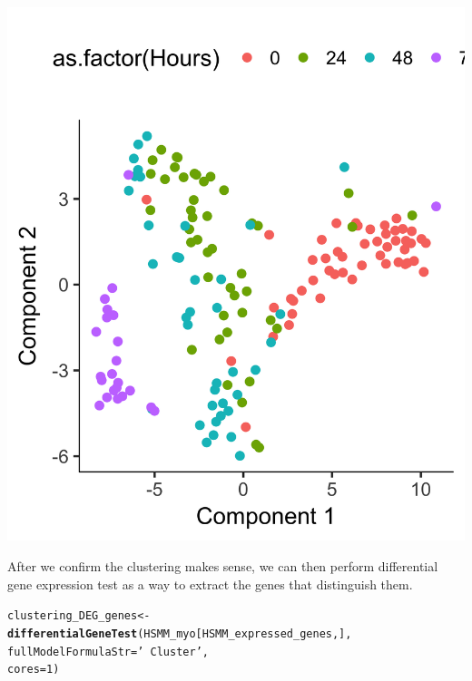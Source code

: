 \documentclass[10pt,oneside]{article}\usepackage[]{graphicx}\usepackage[]{color}
\makeatletter
\def\maxwidth{ %
  \ifdim\Gin@nat@width>\linewidth
    \linewidth
  \else
    \Gin@nat@width
  \fi
}
\newcommand{\hlnum}[1]{\textcolor[rgb]{0.686,0.059,0.569}{#1}}%
\newcommand{\hlstr}[1]{\textcolor[rgb]{0.192,0.494,0.8}{#1}}%
\newcommand{\hlstd}[1]{\textcolor[rgb]{0.345,0.345,0.345}{#1}}%
\newcommand{\hlkwb}[1]{\textcolor[rgb]{0.69,0.353,0.396}{#1}}%
\newcommand{\hlkwc}[1]{\textcolor[rgb]{0.333,0.667,0.333}{#1}}%
\newcommand{\hlkwd}[1]{\textcolor[rgb]{0.737,0.353,0.396}{\textbf{#1}}}%
\newenvironment{kframe}{%
 \def\at@end@of@kframe{}%
 \ifinner\ifhmode%
  \def\at@end@of@kframe{\end{minipage}}%
  \begin{minipage}{\columnwidth}%
 \fi\fi%
 \def\FrameCommand##1{\hskip\@totalleftmargin \hskip-\fboxsep
 \colorbox{shadecolor}{##1}\hskip-\fboxsep
     \hskip-\linewidth \hskip-\@totalleftmargin \hskip\columnwidth}%
 \MakeFramed {\advance\hsize-\width
   \@totalleftmargin\z@ \linewidth\hsize
   \@setminipage}}%
 {\par\unskip\endMakeFramed%
 \at@end@of@kframe}
\newenvironment{knitrout}{}{} %
\makeatother
\begin{document}
\begin{knitrout}
\includegraphics[width=\maxwidth]{figure/check_clustering_again-2} 

\end{knitrout}

After we confirm the clustering makes sense, we can then perform differential 
gene expression test as a way to extract the genes that distinguish them. 
\begin{knitrout}
\color{fgcolor}\begin{kframe}
\begin{alltt}
\hlstd{clustering_DEG_genes} \hlkwb{<-} \hlkwd{differentialGeneTest}\hlstd{(HSMM_myo[HSMM_expressed_genes,],}
                                             \hlkwc{fullModelFormulaStr} \hlstd{=} \hlstr{'~Cluster'}\hlstd{,}
                                             \hlkwc{cores} \hlstd{=} \hlnum{1}\hlstd{)}
\end{alltt}
\end{kframe}
\end{knitrout}
\end{document}
